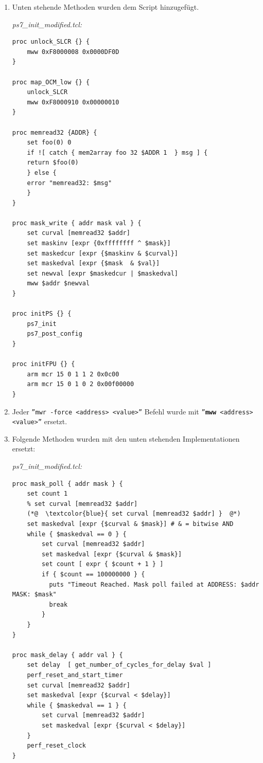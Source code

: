 \begin{enumerate}
\item Unten stehende Methoden wurden dem Script hinzugefügt.

\textit{ps7\_init\_modified.tcl:}
\lstset{language=tcl}
\begin{lstlisting}[frame=single]
proc unlock_SLCR {} {
	mww 0xF8000008 0x0000DF0D
}

proc map_OCM_low {} {
	unlock_SLCR
	mww 0xF8000910 0x00000010
}

proc memread32 {ADDR} {
    set foo(0) 0
    if ![ catch { mem2array foo 32 $ADDR 1  } msg ] {
	return $foo(0)
    } else {
	error "memread32: $msg"
    }
}

proc mask_write { addr mask val } {
	set curval [memread32 $addr]
	set maskinv [expr {0xffffffff ^ $mask}]
    set maskedcur [expr {$maskinv & $curval}]
	set maskedval [expr {$mask  & $val}]
    set newval [expr $maskedcur | $maskedval]
	mww $addr $newval
}

proc initPS {} {
	ps7_init
	ps7_post_config
}

proc initFPU {} {
	arm mcr 15 0 1 1 2 0x0c00
	arm mcr 15 0 1 0 2 0x00f00000
}
\end{lstlisting}

\item Jeder \texttt{''mwr -force <address> <value>''} Befehl wurde mit \texttt{''\textbf{mww} <address> <value>''} ersetzt.

\item Folgende Methoden wurden mit den unten stehenden Implementationen ersetzt:

\textit{ps7\_init\_modified.tcl:}
\lstset{language=tcl}
\begin{lstlisting}[frame=single]
proc mask_poll { addr mask } {
    set count 1
    % set curval [memread32 $addr]
    (*@  \textcolor{blue}{ set curval [memread32 $addr] }  @*)
    set maskedval [expr {$curval & $mask}] # & = bitwise AND
    while { $maskedval == 0 } {
		set curval [memread32 $addr]
        set maskedval [expr {$curval & $mask}]
        set count [ expr { $count + 1 } ]
        if { $count == 100000000 } {
          puts "Timeout Reached. Mask poll failed at ADDRESS: $addr MASK: $mask"
          break
        }
    }
}

proc mask_delay { addr val } {
    set delay  [ get_number_of_cycles_for_delay $val ]
    perf_reset_and_start_timer
    set curval [memread32 $addr]
    set maskedval [expr {$curval < $delay}]
    while { $maskedval == 1 } {
        set curval [memread32 $addr]
        set maskedval [expr {$curval < $delay}]
    }
    perf_reset_clock 
}


\end{lstlisting}
\end{enumerate}
